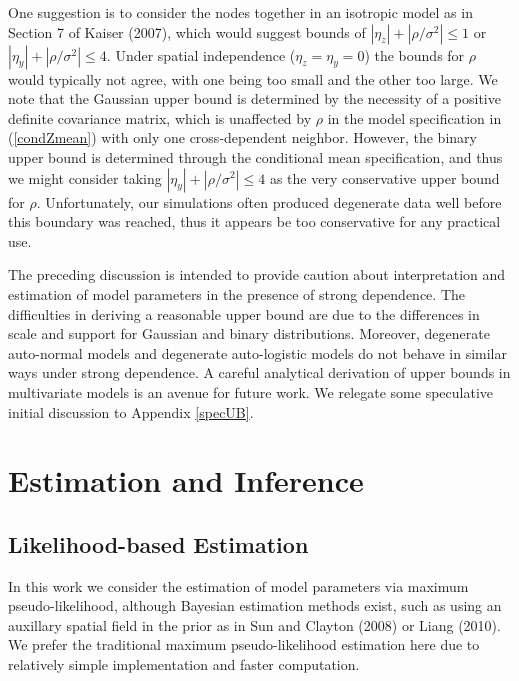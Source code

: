 \documentclass[12pt, a4paper, twoside]{article}
\begin{document}
One suggestion is to consider the nodes together in an isotropic model as in Section 7 of Kaiser (2007), which would suggest bounds of $|\eta_z| + |\rho/\sigma^2| \leq 1$ or $|\eta_y| + |\rho/\sigma^2| \leq 4$. Under spatial independence ($\eta_z=\eta_y=0$) the bounds for $\rho$ would typically not agree, with one being too small and the other too large. We note that the Gaussian upper bound is determined by the necessity of a positive definite covariance matrix, which is unaffected by $\rho$ in the model specification in (\ref{condZmean}) with only one cross-dependent neighbor. However, the binary upper bound is determined through the conditional mean specification, and thus we might consider taking $|\eta_y| + |\rho/\sigma^2| \leq 4$ as the very conservative upper bound for $\rho$. Unfortunately, our simulations often produced degenerate data well before this boundary was reached, thus it appears be too conservative for any practical use. 

The preceding discussion is intended to provide caution about interpretation and estimation of model parameters in the presence of strong dependence. The difficulties in deriving a reasonable upper bound are due to the differences in scale and support for Gaussian and binary distributions. Moreover, degenerate auto-normal models and degenerate auto-logistic models do not behave in similar ways under strong dependence. A careful analytical derivation of upper bounds in multivariate models is an avenue for future work. We relegate some speculative initial discussion to Appendix \ref{specUB}. %

\section{Estimation and Inference} \label{EstimInf}
\subsection{Likelihood-based Estimation} \label{MLEest}
In this work we consider the estimation of model parameters via maximum pseudo-likelihood, although Bayesian estimation methods exist, such as using an auxillary spatial field in the prior as in Sun and Clayton (2008) or Liang (2010). We prefer the traditional maximum pseudo-likelihood estimation here due to relatively simple implementation and faster computation.
\end{document}
